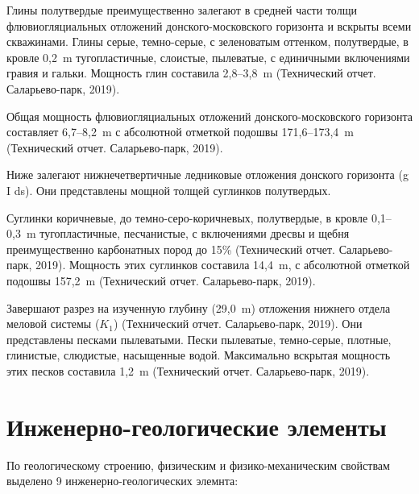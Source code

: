 Глины полутвердые преимущественно залегают в средней части толщи флювиогляциальных 
отложений донского-московского горизонта и вскрыты всеми скважинами.
Глины серые, темно-серые, с зеленоватым оттенком, полутвердые, 
в кровле 0,2~\si{\meter} тугопластичные, слоистые, пылеватые, 
с единичными включениями гравия и гальки. 
Мощность глин составила 2,8--3,8~\si{\meter} (Технический отчет. Саларьево-парк, 2019).

Общая мощность флювиогляциальных отложений донского-московского горизонта 
составляет 6,7--8,2~\si{\meter} с абсолютной отметкой подошвы 
171,6--173,4~\si{\meter} (Технический отчет. Саларьево-парк, 2019).

Ниже залегают нижнечетвертичные ледниковые отложения донского горизонта (g I ds). 
Они представлены мощной толщей суглинков полутвердых.

Суглинки коричневые, до темно-серо-коричневых, полутвердые, 
в кровле 0,1--0,3~\si{\meter} тугопластичные, песчанистые, 
с включениями дресвы и щебня преимущественно карбонатных 
пород до 15\% (Технический отчет. Саларьево-парк, 2019). 
Мощность этих суглинков составила 14,4~\si{\meter}, 
с абсолютной отметкой подошвы 157,2~\si{\meter} (Технический отчет. Саларьево-парк, 2019).

Завершают разрез на изученную глубину (29,0~\si{\meter}) отложения 
нижнего отдела меловой системы ($K_1$) (Технический отчет. Саларьево-парк, 2019). 
Они представлены песками пылеватыми. Пески пылеватые, темно-серые, 
плотные, глинистые, слюдистые, насыщенные водой. 
Максимально вскрытая мощность этих песков 
составила 1,2~\si{\meter} (Технический отчет. Саларьево-парк, 2019).

\section{Инженерно-геологические элементы}\label{sec:ch2/sec2}

По геологическому строению, физическим и физико-механическим 
свойствам выделено 9 инженерно-геологических элемнта:

